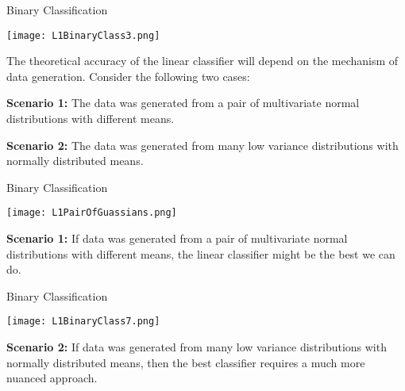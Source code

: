 \documentclass[10pt, handout]{beamer}
\begin{document}
\begin{frame}[fragile]{Binary Classification}
  \begin{minipage}[t][0.5\textheight][t]{\textwidth}
    \centering
     \texttt{[image: L1BinaryClass3.png]}
  \end{minipage}
  \vfill
  \begin{minipage}[t][0.5\textheight][t]{\textwidth}

The theoretical accuracy of the linear classifier will depend on the mechanism of data generation. Consider the following two cases:

\textbf{Scenario 1:} The data was generated from a pair of multivariate normal distributions with different means.

\textbf{Scenario 2:} The data was generated from many low variance distributions with normally distributed means.


 \end{minipage}
\end{frame}



\begin{frame}[fragile]{Binary Classification}
  \begin{minipage}[t][0.5\textheight][t]{\textwidth}
    \centering
     \texttt{[image: L1PairOfGuassians.png]}
  \end{minipage}
  \vfill
  \begin{minipage}[t][0.5\textheight][t]{\textwidth}


\textbf{Scenario 1:} If data was generated from a pair of multivariate normal distributions with different means, the linear classifier might be the best we can do. 


 \end{minipage}
\end{frame}



\begin{frame}[fragile]{Binary Classification}
  \begin{minipage}[t][0.5\textheight][t]{\textwidth}
    \centering
     \texttt{[image: L1BinaryClass7.png]}
  \end{minipage}
  \vfill
  \begin{minipage}[t][0.5\textheight][t]{\textwidth}


\textbf{Scenario 2:} If data was generated from many low variance distributions with normally distributed means, then the best classifier requires a much more nuanced approach.

 \end{minipage}
\end{frame}
\end{document}
